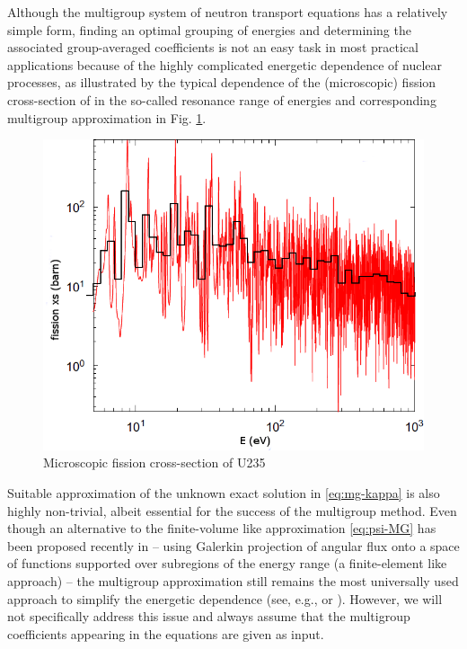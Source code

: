Although the multigroup system of neutron transport equations has a relatively simple form, finding an optimal grouping
of energies and determining the associated group-averaged coefficients is not an easy task in most practical
applications because of the highly complicated energetic dependence of nuclear processes, as illustrated by the typical
dependence of the (microscopic) fission cross-section of  in the so-called resonance range of
energies and corresponding multigroup approximation in Fig. \ref{fig:xs}.
\begin{figure}[htp]
\begin{center}
  \includegraphics[scale=.4]{U235fg}
  \caption{Microscopic fission cross-section of U235}
  \label{fig:xs}
\end{center}
\end{figure}
Suitable approximation of the unknown exact solution in \eqref{eq:mg-kappa} is also highly non-trivial, albeit essential
for the success of the multigroup method. Even though an alternative to the finite-volume like approximation
\eqref{eq:psi-MG} has been proposed recently  in \cite{Douglass} -- using Galerkin projection of angular flux onto a
space of functions supported over subregions of the energy range (a finite-element like approach) --  the multigroup 
approximation still remains the most universally used approach to simplify the energetic dependence (see, e.g., 
\cite[Chap.~5]{Cacuci1} or \cite{Cho1}). However, we will not specifically address this issue and always assume that 
the multigroup coefficients appearing in the equations are given as input.
